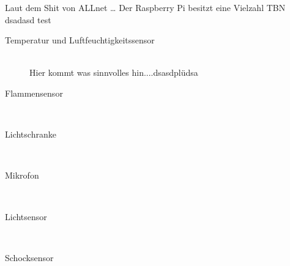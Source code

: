 
Laut dem Shit von ALLnet \cite{111861pd90} \ldots
Der Raspberry Pi besitzt eine Vielzahl  TBN
dsadasd test

\begin{description}
\item[Temperatur und Luftfeuchtigkeitssensor] \hfill \\
	Hier kommt was sinnvolles hin....dsasdplüdsa
\item[Flammensensor]\hfill \\
\item[Lichtschranke]\hfill \\
\item[Mikrofon]\hfill \\
\item[Lichtsensor]\hfill \\
\item[Schocksensor]\hfill \\
\end{description}